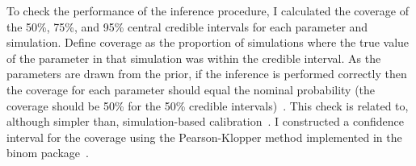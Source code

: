 \documentclass[thesis.tex]{subfiles}
\begin{document}

To check the performance of the inference procedure, I calculated the coverage of the 50\%, 75\%, and 95\% central credible intervals for each parameter and simulation.
Define coverage as the proportion of simulations where the true value of the parameter in that simulation was within the credible interval.
As the parameters are drawn from the prior, if the inference is performed correctly then the coverage for each parameter should equal the nominal probability (\eg the coverage should be 50\% for the 50\% credible intervals)~\autocite{cookValidation}.
This check is related to, although simpler than, simulation-based calibration~\autocite{taltsValidating}.
I constructed a confidence interval for the coverage using the Pearson-Klopper method implemented in the binom package~\autocite{binom1-1}.
\end{document}
